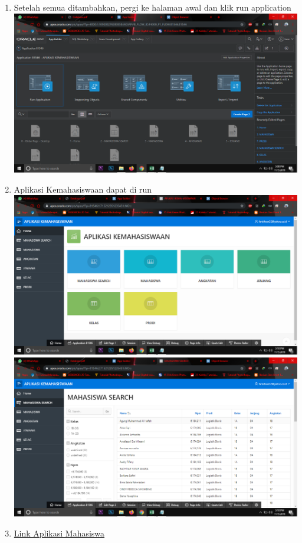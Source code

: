 \begin{enumerate}
\item Setelah semua ditambahkan, pergi ke halaman awal dan klik run application\\
\includegraphics[scale = 0.3]{gambar/11.png}

\item Aplikasi Kemahasiswaan dapat di run\\
\includegraphics[scale = 0.3]{gambar/12.png}
\includegraphics[scale = 0.3]{gambar/13.png}

\item \href {https://apex.oracle.com/pls/apex/f?p=81546:1:715212351235451::NO:::}{Link Aplikasi Mahasiswa}

\end{enumerate}


